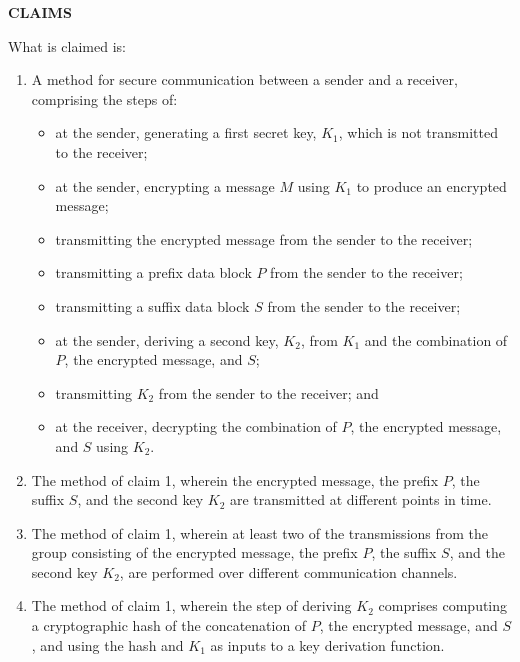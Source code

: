 \documentclass[11pt,letterpaper]{article}
\begin{document}
\thispagestyle{empty}

\begin{center}
    \textbf{\large CLAIMS}
\end{center}

\vspace{0.4cm}
\noindent What is claimed is:

\begin{enumerate}[label=\textbf{\arabic*.}, leftmargin=0.5in, itemsep=0.4cm]
    \item A method for secure communication between a sender and a receiver, comprising the steps of:
    \begin{itemize}[leftmargin=0.3in, noitemsep]
        \item at the sender, generating a first secret key, $K_1$, which is not transmitted to the receiver;
        \item at the sender, encrypting a message $M$ using $K_1$ to produce an encrypted message;
        \item transmitting the encrypted message from the sender to the receiver;
        \item transmitting a prefix data block $P$ from the sender to the receiver;
        \item transmitting a suffix data block $S$ from the sender to the receiver;
        \item at the sender, deriving a second key, $K_2$, from $K_1$ and the combination of $P$, the encrypted message, and $S$;
        \item transmitting $K_2$ from the sender to the receiver; and
        \item at the receiver, decrypting the combination of $P$, the encrypted message, and $S$ using $K_2$.
    \end{itemize}

    \item The method of claim 1, wherein the encrypted message, the prefix $P$, the suffix $S$, and the second key $K_2$ are transmitted at different points in time.

    \item The method of claim 1, wherein at least two of the transmissions from the group consisting of the encrypted message, the prefix $P$, the suffix $S$, and the second key $K_2$, are performed over different communication channels.

    \item The method of claim 1, wherein the step of deriving $K_2$ comprises computing a cryptographic hash of the concatenation of $P$, the encrypted message, and $S$, and using the hash and $K_1$ as inputs to a key derivation function.


\end{enumerate}
\end{document}
